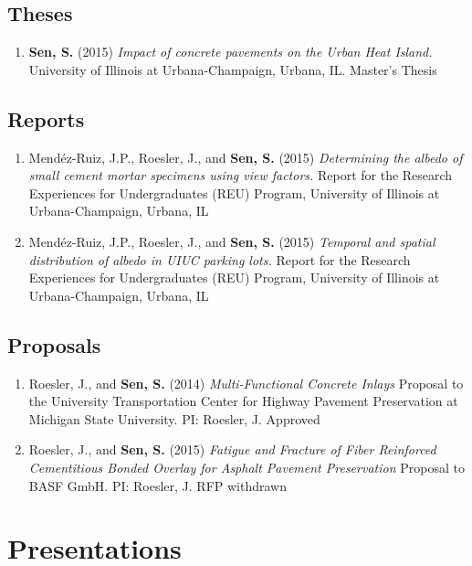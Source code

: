 \documentclass[12pt]{article}
\begin{document}
\subsection*{Theses}
\begin{enumerate}[label=(T\arabic*)]
	\item \textbf{Sen, S.} (2015) \textit{Impact of concrete pavements on the 		Urban Heat Island.} University of Illinois at Urbana-Champaign, Urbana, IL. Master’s Thesis
\end{enumerate}

\subsection*{Reports}
\begin{enumerate}[label=(R\arabic*)]
	\item Mend\'ez-Ruiz, J.P., Roesler, J., and \textbf{Sen, S.} (2015) \textit{Determining the albedo of small cement mortar specimens using view factors.} Report for the Research Experiences for Undergraduates (REU) Program, University of Illinois at Urbana-Champaign, Urbana, IL
	\item Mend\'ez-Ruiz, J.P., Roesler, J., and \textbf{Sen, S.} (2015) \textit{Temporal and spatial distribution of albedo in UIUC parking lots.} Report for the Research Experiences for Undergraduates (REU) Program, University of Illinois at Urbana-Champaign, Urbana, IL
\end{enumerate}

\subsection*{Proposals}
\begin{enumerate}[label=(P\arabic*)]
	\item Roesler, J., and \textbf{Sen, S.} (2014) \textit{Multi-Functional Concrete Inlays} Proposal to the University Transportation Center for Highway Pavement Preservation at Michigan State University. PI: Roesler, J. Approved
	\item Roesler, J., and \textbf{Sen, S.} (2015) \textit{Fatigue and Fracture of Fiber Reinforced Cementitious Bonded Overlay for Asphalt Pavement Preservation} Proposal to BASF GmbH. PI: Roesler, J. RFP withdrawn
\end{enumerate}

\section*{Presentations}
\end{document}
